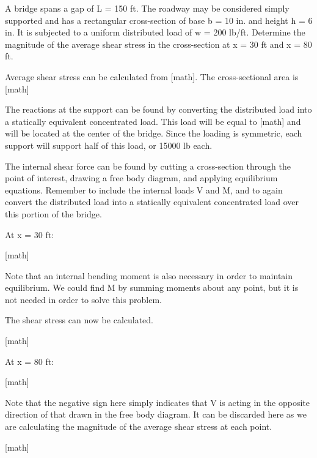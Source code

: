 \documentclass[
  letterpaper,
  DIV=11,
  numbers=noendperiod]{scrreprt}
\begin{document}
\begin{tcolorbox}[enhanced jigsaw, colback=white, colframe=quarto-callout-note-color-frame, leftrule=.75mm, opacitybacktitle=0.6, colbacktitle=quarto-callout-note-color!10!white, arc=.35mm, bottomrule=.15mm, breakable, title={Example 2.3: Simple shear stress}, left=2mm, titlerule=0mm, toptitle=1mm, toprule=.15mm, opacityback=0, rightrule=.15mm, coltitle=black, bottomtitle=1mm]

A bridge spans a gap of L = 150 ft. The roadway may be considered simply
supported and has a rectangular cross-section of base b = 10 in. and
height h = 6 in. It is subjected to a uniform distributed load of w =
200 lb/ft. Determine the magnitude of the average shear stress in the
cross-section at x = 30 ft and x = 80 ft.

\begin{tcolorbox}[enhanced jigsaw, colback=white, colframe=quarto-callout-note-color-frame, leftrule=.75mm, opacitybacktitle=0.6, colbacktitle=quarto-callout-note-color!10!white, arc=.35mm, bottomrule=.15mm, breakable, title={Solution}, left=2mm, titlerule=0mm, toptitle=1mm, toprule=.15mm, opacityback=0, rightrule=.15mm, coltitle=black, bottomtitle=1mm]

Average shear stress can be calculated from {[}math{]}. The
cross-sectional area is {[}math{]}

The reactions at the support can be found by converting the distributed
load into a statically equivalent concentrated load. This load will be
equal to {[}math{]} and will be located at the center of the bridge.
Since the loading is symmetric, each support will support half of this
load, or 15000 lb each.

The internal shear force can be found by cutting a cross-section through
the point of interest, drawing a free body diagram, and applying
equilibrium equations. Remember to include the internal loads V and M,
and to again convert the distributed load into a statically equivalent
concentrated load over this portion of the bridge.

At x = 30 ft:

{[}math{]}

Note that an internal bending moment is also necessary in order to
maintain equilibrium. We could find M by summing moments about any
point, but it is not needed in order to solve this problem.

The shear stress can now be calculated.

{[}math{]}

At x = 80 ft:

{[}math{]}

Note that the negative sign here simply indicates that V is acting in
the opposite direction of that drawn in the free body diagram. It can be
discarded here as we are calculating the magnitude of the average shear
stress at each point.

{[}math{]}

\end{tcolorbox}

\end{tcolorbox}
\end{document}

